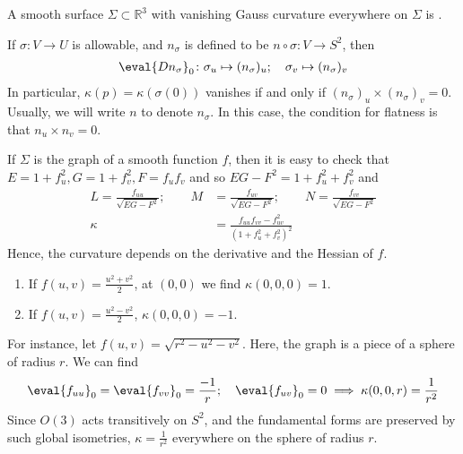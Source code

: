 \begin{definition}[Flat]
	A smooth surface $\Sigma \subset \mathbb R^3$ with vanishing Gauss curvature everywhere on $\Sigma$ is .
\end{definition}

\begin{remark}
	If $\sigma\colon V \to U$ is allowable, and $n_\sigma$ is defined to be $n \circ \sigma \colon V \to S^2$, then
	\begin{align*}
		\eval{Dn_\sigma}_0 \colon \sigma_u \mapsto (n_\sigma)_u;\quad \sigma_v \mapsto (n_\sigma)_v
	\end{align*}
	In particular, $\kappa(p) = \kappa(\sigma(0))$ vanishes if and only if $(n_\sigma)_u \times (n_\sigma)_v = 0$.
	Usually, we will write $n$ to denote $n_\sigma$.
	In this case, the condition for flatness is that $n_u \times n_v = 0$.
\end{remark}

\begin{example}
	If $\Sigma$ is the graph of a smooth function $f$, then it is easy to check that $E = 1 + f_u^2, G = 1 + f_v^2, F = f_u f_v$ and so $EG - F^2 = 1 + f_u^2 + f_v^2$ and
	\begin{align*}
		L = \frac{f_{uu}}{\sqrt{EG - F^2}};\qquad M &= \frac{f_{uv}}{\sqrt{EG - F^2}};\qquad N = \frac{f_{vv}}{\sqrt{EG - F^2}} \\
		\kappa &= \frac{f_{uu} f_{vv} - f_{uv}^2}{(1+f_u^2 + f_v^2)^2}
	\end{align*}
	Hence, the curvature depends on the derivative and the Hessian of $f$.

	\begin{enumerate}
		\item If $f(u, v) = \frac{u^2 + v^2}{2}$, at $(0, 0)$ we find $\kappa(0, 0, 0) = 1$.
		\item If $f(u, v) = \frac{u^2 - v^2}{2}$, $\kappa(0, 0, 0) = -1$.
	\end{enumerate} 

	For instance, let $f(u,v) = \sqrt{r^2 - u^2 - v^2}$.
	Here, the graph is a piece of a sphere of radius $r$.
	We can find
	\begin{align*}
		\eval{f_{uu}}_0 = \eval{f_{vv}}_0 = \frac{-1}{r};\quad \eval{f_{uv}}_0 = 0 \implies \kappa(0,0,r) = \frac{1}{r^2}
	\end{align*}
	Since $O(3)$ acts transitively on $S^2$, and the fundamental forms are preserved by such global isometries, $\kappa = \frac{1}{r^2}$ everywhere on the sphere of radius $r$.
\end{example}

